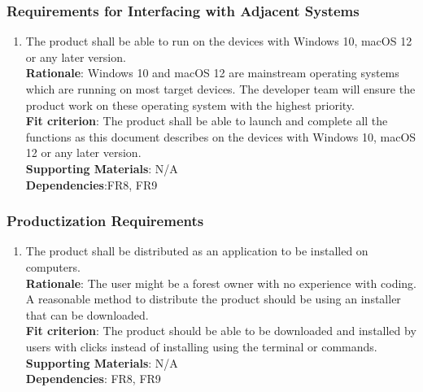 \documentclass{article}
\begin{document}
\subsubsection{Requirements for Interfacing with Adjacent Systems}
\begin{enumerate}[OE2.1]
    \item The product shall be able to run on the devices with Windows 10, macOS 12 or any later version.\\
    \textbf{Rationale}: Windows 10 and macOS 12 are mainstream operating systems which are running on most target devices. The developer team will ensure the product work on these operating system with the highest priority.\\
    \textbf{Fit criterion}: The product shall be able to launch and complete all the functions as this document describes on the devices with Windows 10, macOS 12 or any later version.\\
\textbf{Supporting Materials}: N/A\\
\textbf{Dependencies}:FR8, FR9\\

\end{enumerate}
\subsubsection{Productization Requirements}
\begin{enumerate}[OE3.1]
    \item The product shall be distributed as an application to be installed on computers.\\
    \textbf{Rationale}: The user might be a forest owner with no experience with coding. A reasonable method to distribute the product should be using an installer that can be downloaded. \\
    \textbf{Fit criterion}: The product should be able to be downloaded and installed by users with clicks instead of installing using the terminal or commands.\\
\textbf{Supporting Materials}: N/A\\
\textbf{Dependencies}: FR8, FR9\\

\end{enumerate}
\end{document}
